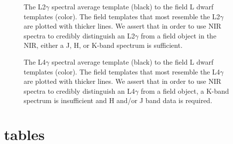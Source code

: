 \documentclass[12pt,preprint]{aastex}
\begin{document}
\begin{figure}
	\caption{The L2$\gamma$ spectral average template (black) to the field L dwarf templates (color). The field templates that most resemble the L2$\gamma$ are plotted with thicker lines. We assert that in order to use NIR spectra to credibly distinguish an L2$\gamma$ from a field object in the NIR, either a J, H, or K-band spectrum is sufficient.}
	\label{fig:L2g-field}
\end{figure}

\begin{figure}
	\caption{The L4$\gamma$ spectral average template (black) to the field L dwarf templates (color). The field templates that most resemble the L4$\gamma$ are plotted with thicker lines. We assert that in order to use NIR spectra to credibly distinguish an L4$\gamma$ from a field object, a K-band spectrum is insufficient and H and/or J band data is required.}
	\label{fig:L4g-field}
\end{figure}


\clearpage

\section{tables}
% 
% 

\clearpage
% 
% 
\end{document}
